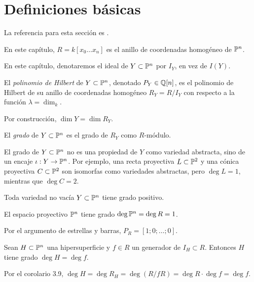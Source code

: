 \section{Definiciones básicas}

\noindent La referencia para esta sección es \cite[p. 52]{hartshorne}.

\begin{preliminaries}
En este capítulo, $R = k[x_0 \dots x_n]$ es el anillo de coordenadas homogéneo de $\P^n$.
\end{preliminaries}

\begin{notation}
En este capítulo, denotaremos el ideal de $Y \subset \P^n$ por $I_Y$, en vez de $I(Y)$.
\end{notation}

\begin{definition}
El \textit{polinomio de Hilbert} de $Y \subset \P^n$, denotado $P_Y \in \Q[n]$, es el polinomio de Hilbert de su anillo de coordenadas homogéneo $R_Y = R/I_Y$ con respecto a la función $\lambda = \dim_k$.
\end{definition}

\begin{remark}
Por construcción, $\dim Y = \dim R_Y$.
\end{remark}

\begin{definition}
El \textit{grado} de $Y \subset \P^n$ es el grado de $R_Y$ como $R$-módulo.
\end{definition}

\begin{remark}
El grado de $Y \subset \P^n$ no es una propiedad de $Y$ como variedad abstracta, sino de un encaje $\iota : Y \to \P^n$. Por ejemplo, una recta proyectiva $L \subset \P^2$ y una cónica proyectiva $C \subset \P^2$ son isomorfas como variedades abstractas, pero $\deg L = 1$, mientras que $\deg C = 2$.
\end{remark}

\begin{example}
Toda variedad no vacía $Y \subset \P^n$ tiene grado positivo.
\end{example}

\begin{example}
El espacio proyectivo $\P^n$ tiene grado $\deg \P^n = \deg R = 1$.
\end{example}

\begin{remark}
Por el argumento de estrellas y barras, $P_R = [1; 0; \dots; 0]$.
\end{remark}

\begin{example}
Sean $H \subset \P^n$ una hipersuperficie y $f \in R$ un generador de $I_H \subset R$. Entonces $H$ tiene grado $\deg H = \deg f$.
\end{example}

\begin{remark}
Por el corolario 3.9, $\deg H = \deg R_H = \deg {(R / fR)} = \deg R \cdot \deg f = \deg f$.
\end{remark}
